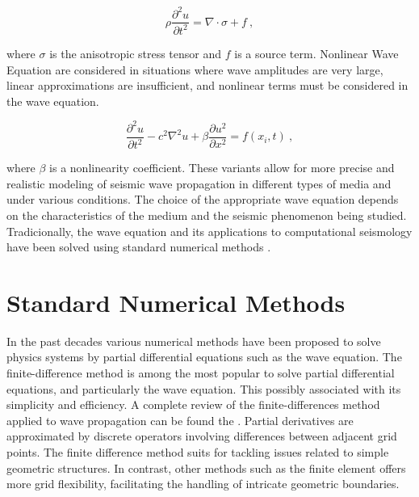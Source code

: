 \documentclass[11pt,twoside]{article}
\begin{document}
\begin{equation*}
\rho \frac{\partial^2 u}{\partial t^2} = \nabla \cdot \sigma + f \ ,
\label{anisotropic}
\end{equation*}
    
where $\sigma$ is the anisotropic stress tensor and $f$ is a source term. Nonlinear Wave Equation are considered 
in situations where wave amplitudes are very large, linear approximations are insufficient, and nonlinear terms 
must be considered in the wave equation.

\begin{equation*}
\frac{\partial^2 u}{\partial t^2} - c^2 \nabla^2 u + \beta \frac{\partial u^2}{\partial x^2} = f(x_i, t) \ ,
\label{nonlinear}
\end{equation*}
    
where $\beta$ is a nonlinearity coefficient. These variants allow for more precise and realistic modeling 
of seismic wave propagation in different types of media and under various conditions. The choice of the 
appropriate wave equation depends on the characteristics of the medium and the seismic phenomenon being studied. 
Tradicionally, the wave equation and its applications to computational seismology have been solved using standard 
numerical methods \citep{Igel2017}.

\section{Standard Numerical Methods}\label{sec:standard_numerical_methods}

In the past decades various numerical methods have been proposed to solve physics systems by partial differential 
equations such as the wave equation. The finite-difference method is among the most 
popular to solve partial differential equations, and particularly the wave equation. This possibly associated with 
its simplicity and efficiency. A complete review of the finite-differences method applied to wave propagation can be 
found the . Partial derivatives are approximated by discrete operators involving differences 
between adjacent grid points. The finite difference method suits for tackling issues related to simple geometric 
structures. In contrast, other methods such as the finite element offers more grid flexibility, facilitating the 
handling of intricate geometric boundaries.
\end{document}
